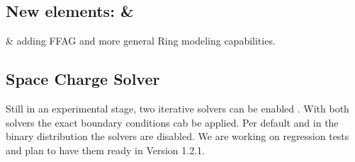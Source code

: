 \subsection{New elements:  \& }

  \&   adding FFAG and more general Ring modeling capabilities.

\subsection{Space Charge Solver}
Still in an experimental stage, two iterative solvers can be enabled . With both solvers the exact boundary conditions
cab be applied.  Per default and in the binary distribution the solvers are disabled. We are working on regression tests and plan to have them ready in Version 1.2.1.

